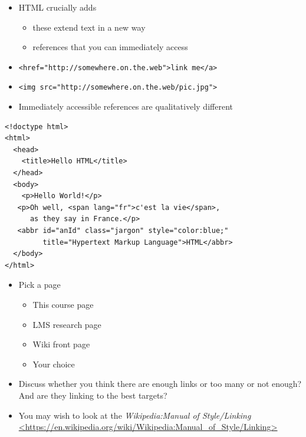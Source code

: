 \documentclass[a4paper,landscape,headrule,footrule,xetex]{foils}
\begin{document}

\begin{itemize}
\item HTML crucially adds 
  \begin{itemize}
  \item these extend text in a new way
  \item references that you can immediately access
  \end{itemize}
\item \texttt{<href="http://somewhere.on.the.web">link me</a>}
\item \texttt{<img src="http://somewhere.on.the.web/pic.jpg">}
\item Immediately accessible references are qualitatively different
\end{itemize}

\begin{verbatim}
<!doctype html>
<html>
  <head>
    <title>Hello HTML</title>
  </head>
  <body>
    <p>Hello World!</p>
   <p>Oh well, <span lang="fr">c'est la vie</span>, 
      as they say in France.</p>
   <abbr id="anId" class="jargon" style="color:blue;" 
         title="Hypertext Markup Language">HTML</abbr>
  </body>
</html>
\end{verbatim}



\begin{itemize}
\item Pick a page
  \begin{itemize}
  \item This course page
  \item LMS research page
  \item Wiki front page
  \item Your choice
  \end{itemize}
\item Discuss whether you think there are enough links or too many or
  not enough?  And are they linking to the best targets?
\item You may wish to look at the \textit{Wikipedia:Manual of Style/Linking}
\\ \url{<https://en.wikipedia.org/wiki/Wikipedia:Manual_of_Style/Linking>}
\end{itemize}


\end{document}
